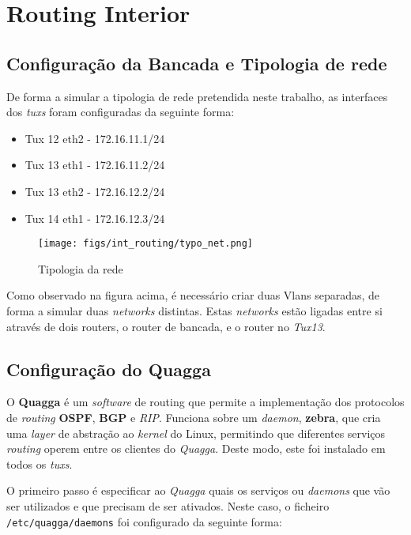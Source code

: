 \chapter{Routing Interior} \label{sec:int_routing}

\section{Configuração da Bancada e Tipologia de rede}

De forma a simular a tipologia de rede pretendida neste trabalho, as interfaces dos \textit{tuxs} foram configuradas da seguinte forma:

\begin{itemize}
    \item Tux 12 eth2 - 172.16.11.1/24
    \item Tux 13 eth1 - 172.16.11.2/24
    \item Tux 13 eth2 - 172.16.12.2/24
    \item Tux 14 eth1 - 172.16.12.3/24
\end{itemize}

\begin{figure}[H]
    \centering
    \texttt{[image: figs/int\_routing/typo\_net.png]}
    \caption{Tipologia da rede}
    \label{fig:typo_net}
\end{figure}

Como observado na figura acima, é necessário criar duas Vlans separadas, de forma a simular duas \textit{networks} distintas.
Estas \textit{networks} estão ligadas entre si através de dois routers, o router de bancada, e o router no \textit{Tux13}.

\section{Configuração do Quagga}

O \textbf{Quagga} \cite{quagga} é um \textit{software} de routing que permite a implementação dos protocolos de \textit{routing}
\textbf{OSPF}, \textbf{BGP} e \textit{RIP}. Funciona sobre um \textit{daemon}, \textbf{zebra}, que cria uma \textit{layer} de abstração
ao \textit{kernel} do Linux, permitindo que diferentes serviços \textit{routing} operem entre os clientes do \textit{Quagga}.
Deste modo, este foi instalado em todos os \textit{tuxs}. 

O primeiro passo é especificar ao \textit{Quagga} quais os serviços ou \textit{daemons} que vão ser utilizados e que precisam de ser ativados.
Neste caso, o ficheiro \verb|/etc/quagga/daemons| foi configurado da seguinte forma:

